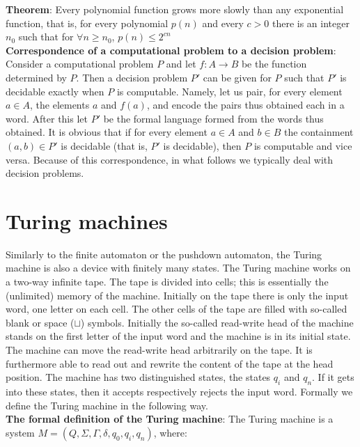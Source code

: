 \documentclass[margin=0px]{article}
\begin{document}
\noindent \textbf{Theorem}: Every polynomial function grows more slowly than any exponential function,
that is, for every polynomial $p(n)$ and every $c>0$ there is an integer $n_{0}$ such that for $\forall n \geq n_{0}$, $p(n) \leq 2^{cn}$\\

\noindent \textbf{Correspondence of a computational problem to a decision problem}: Consider a computational problem $P$
and let $f: A \to B$ be the function determined by $P$. Then a decision problem $P'$ can be given for $P$ such that
$P'$ is decidable exactly when $P$ is computable. Namely, let us pair, for every element $a \in A$, the elements $a$ and $f(a)$,
and encode the pairs thus obtained each in a word. After this let $P'$ be the formal language formed from the words thus obtained.
It is obvious that if for every element $a \in A$ and $b \in B$ the containment $(a,b) \in P'$ is decidable (that is, $P'$ is decidable), then
$P$ is computable and vice versa.
Because of this correspondence, in what follows we typically deal with decision problems.

\section{Turing machines}

Similarly to the finite automaton or the pushdown automaton, the Turing machine is also
a device with finitely many states. The Turing machine works on a two-way
infinite tape. The tape is divided into cells; this is essentially the (unlimited) memory of the machine.
Initially on the tape there is only the input word, one letter on each cell. The other cells of the tape are
filled with so-called blank or space ($\sqcup$) symbols. Initially the so-called read-write
head of the machine stands on the first letter of the input word and the machine is in its initial state.
The machine can move the read-write head arbitrarily on the tape. It is furthermore able to
read out and rewrite the content of the tape at the head position. The machine has two
distinguished states, the states $q_{i}$ and $q_{n}$. If it gets into these states,
then it accepts respectively rejects the input word.
Formally we define the Turing machine in the following way.\\

\noindent \textbf{The formal definition of the Turing machine}: The Turing machine is a system
$M = (Q, \Sigma, \Gamma, \delta, q_{0}, q_{i}, q_{n})$, where:
\end{document}
